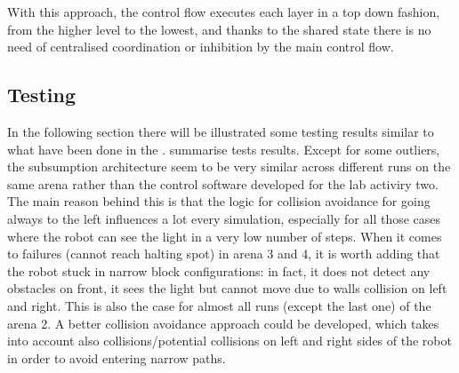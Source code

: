 \bigskip
With this approach, the control flow executes each layer in a top down fashion,
from the higher level to the lowest, and thanks to the shared state there is no
need of centralised coordination or inhibition by the main control flow.

\subsection{Testing}\label{ssec:sub-testing}
In the following section there will be illustrated some testing results similar
to what have been done in the .
 summarise tests results. Except for some
outliers, the subsumption architecture seem to be very similar across different
runs on the same arena rather than the control software developed for the lab
activiry two. The main reason behind this is that the logic for collision
avoidance for going always to the left influences a lot every simulation,
especially for all those cases where the robot can see the light in a very low
number of steps. When it comes to failures (cannot reach halting spot) in arena
3 and 4, it is worth adding that the robot stuck in narrow block
configurations: in fact, it does not detect any obstacles on front, it sees the
light but cannot move due to walls collision on left and right. This is also
the case for almost all runs (except the last one) of the arena 2. A better
collision avoidance approach could be developed, which takes into account also
collisions/potential collisions on left and right sides of the robot in order
to avoid entering narrow paths.

